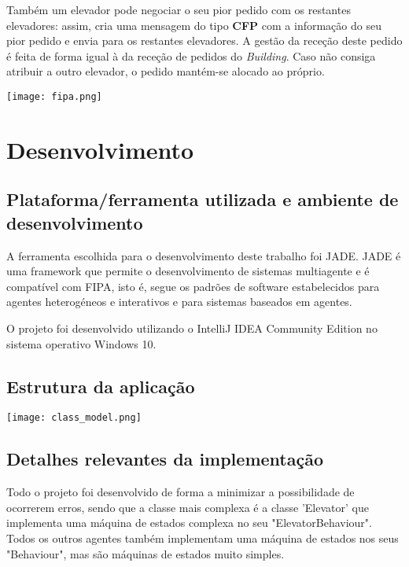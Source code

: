 \documentclass[a4paper]{article}
\begin{document}
Também um elevador pode negociar o seu pior pedido com os restantes elevadores: assim, cria uma mensagem do tipo \textbf{CFP} com a informação do seu pior pedido e envia para os restantes elevadores. A gestão da receção deste pedido é feita de forma igual à da receção de pedidos do \textit{Building}. Caso não consiga atribuir a outro elevador, o pedido mantém-se alocado ao próprio. 

\begin{center}
	\texttt{[image: fipa.png]}
\end{center}

\newpage

\section{Desenvolvimento}

\subsection{Plataforma/ferramenta utilizada e ambiente de desenvolvimento} 

A ferramenta escolhida para o desenvolvimento deste trabalho foi JADE. JADE é uma framework que permite o desenvolvimento de sistemas multiagente e é compatível com FIPA, isto é, segue os padrões de software estabelecidos para agentes heterogéneos e interativos e para sistemas baseados em agentes.

O projeto foi desenvolvido utilizando o IntelliJ IDEA Community Edition no sistema operativo Windows 10.

\subsection{Estrutura da aplicação} 

\begin{center}
\hspace*{-3.2cm}
	\texttt{[image: class\_model.png]}\linebreak\linebreak
\end{center}

\subsection{Detalhes relevantes da implementação} 

Todo o projeto foi desenvolvido de forma a minimizar a possibilidade de ocorrerem erros, sendo que a classe mais complexa é a classe 'Elevator' que implementa uma máquina de estados complexa no seu "ElevatorBehaviour". Todos os outros agentes também implementam uma máquina de estados nos seus "Behaviour", mas são máquinas de estados muito simples.
\end{document}
